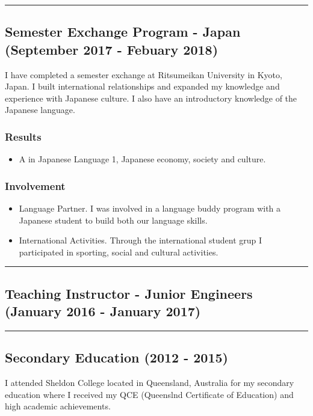 \noindent\rule{\textwidth}{0.5pt}

\subsection*{Semester Exchange Program - Japan (September 2017 - Febuary 2018)}
I have completed a semester exchange at Ritsumeikan University in Kyoto, Japan. I built international relationships and expanded my knowledge and experience with Japanese culture. I also have an introductory knowledge of the Japanese language. 

\subsubsection*{Results}
\begin{itemize}
  \item A in Japanese Language 1, Japanese economy, society and culture.
\end{itemize}

\subsubsection*{Involvement}
\begin{itemize}
  \item Language Partner. I was involved in a language buddy program with a Japanese student to build both our language skills.
  \item International Activities. Through the international student grup I participated in sporting, social and cultural activities.
\end{itemize}

\noindent\rule{\textwidth}{0.5pt}

\subsection*{Teaching Instructor - Junior Engineers (January 2016 - January 2017)}

\noindent\rule{\textwidth}{0.5pt}

\subsection*{Secondary Education (2012 - 2015)}

I attended Sheldon College located in Queensland, Australia for my secondary education where I received my QCE (Queenslnd Certificate of Education) and high academic achievements.

